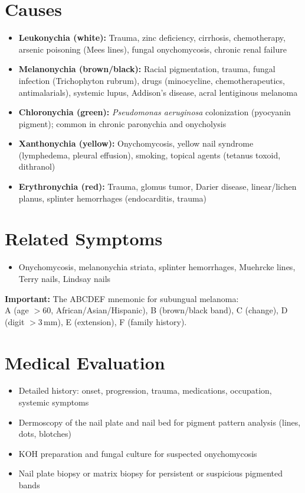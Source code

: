 \section*{Causes}
\begin{itemize}
  \item \textbf{Leukonychia (white):} Trauma, zinc deficiency, cirrhosis, chemotherapy, arsenic poisoning (Mees lines), fungal onychomycosis, chronic renal failure
  \item \textbf{Melanonychia (brown/black):} Racial pigmentation, trauma, fungal infection (Trichophyton rubrum), drugs (minocycline, chemotherapeutics, antimalarials), systemic lupus, Addison's disease, acral lentiginous melanoma
  \item \textbf{Chloronychia (green):} \textit{Pseudomonas aeruginosa} colonization (pyocyanin pigment); common in chronic paronychia and onycholysis
  \item \textbf{Xanthonychia (yellow):} Onychomycosis, yellow nail syndrome (lymphedema, pleural effusion), smoking, topical agents (tetanus toxoid, dithranol)
  \item \textbf{Erythronychia (red):} Trauma, glomus tumor, Darier disease, linear/lichen planus, splinter hemorrhages (endocarditis, trauma)
\end{itemize}

\section*{Related Symptoms}
\begin{itemize}
  \item Onychomycosis, melanonychia striata, splinter hemorrhages, Muehrcke lines, Terry nails, Lindsay nails
\end{itemize}
\textbf{Important:} The ABCDEF mnemonic for subungual melanoma:\\[2pt] A (age $>$60, African/Asian/Hispanic), B (brown/black band), C (change), D (digit $>$3\,mm), E (extension), F (family history).

\section*{Medical Evaluation}
\begin{itemize}
  \item Detailed history: onset, progression, trauma, medications, occupation, systemic symptoms
  \item Dermoscopy of the nail plate and nail bed for pigment pattern analysis (lines, dots, blotches)
  \item KOH preparation and fungal culture for suspected onychomycosis
  \item Nail plate biopsy or matrix biopsy for persistent or suspicious pigmented bands
\end{itemize}

